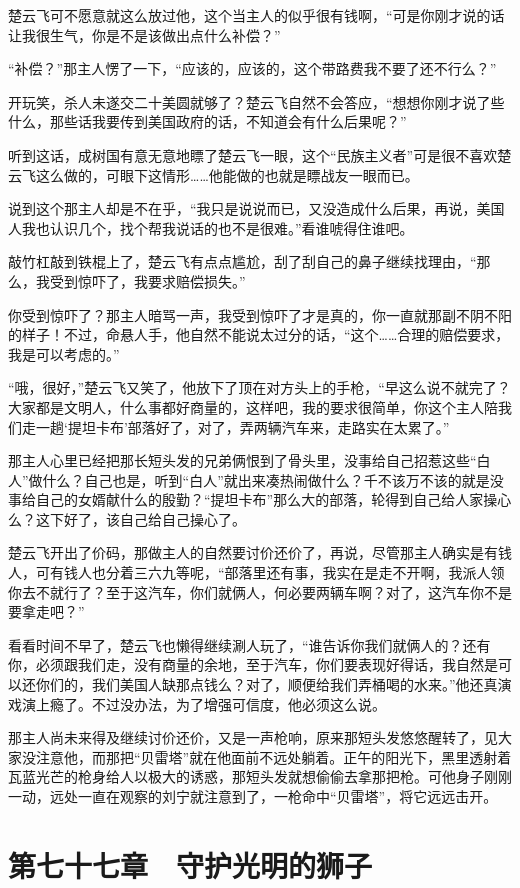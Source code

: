 楚云飞可不愿意就这么放过他，这个当主人的似乎很有钱啊，“可是你刚才说的话让我很生气，你是不是该做出点什么补偿？”

“补偿？”那主人愣了一下，“应该的，应该的，这个带路费我不要了还不行么？”

开玩笑，杀人未遂交二十美圆就够了？楚云飞自然不会答应，“想想你刚才说了些什么，那些话我要传到美国政府的话，不知道会有什么后果呢？”

听到这话，成树国有意无意地瞟了楚云飞一眼，这个“民族主义者”可是很不喜欢楚云飞这么做的，可眼下这情形……他能做的也就是瞟战友一眼而已。

说到这个那主人却是不在乎，“我只是说说而已，又没造成什么后果，再说，美国人我也认识几个，找个帮我说话的也不是很难。”看谁唬得住谁吧。

敲竹杠敲到铁棍上了，楚云飞有点点尴尬，刮了刮自己的鼻子继续找理由，“那么，我受到惊吓了，我要求赔偿损失。”

你受到惊吓了？那主人暗骂一声，我受到惊吓了才是真的，你一直就那副不阴不阳的样子！不过，命悬人手，他自然不能说太过分的话，“这个……合理的赔偿要求，我是可以考虑的。”

“哦，很好，”楚云飞又笑了，他放下了顶在对方头上的手枪，“早这么说不就完了？大家都是文明人，什么事都好商量的，这样吧，我的要求很简单，你这个主人陪我们走一趟‘提坦卡布’部落好了，对了，弄两辆汽车来，走路实在太累了。”

那主人心里已经把那长短头发的兄弟俩恨到了骨头里，没事给自己招惹这些“白人”做什么？自己也是，听到“白人”就出来凑热闹做什么？千不该万不该的就是没事给自己的女婿献什么的殷勤？“提坦卡布”那么大的部落，轮得到自己给人家操心么？这下好了，该自己给自己操心了。

楚云飞开出了价码，那做主人的自然要讨价还价了，再说，尽管那主人确实是有钱人，可有钱人也分着三六九等呢，“部落里还有事，我实在是走不开啊，我派人领你去不就行了？至于这汽车，你们就俩人，何必要两辆车啊？对了，这汽车你不是要拿走吧？”

看看时间不早了，楚云飞也懒得继续涮人玩了，“谁告诉你我们就俩人的？还有你，必须跟我们走，没有商量的余地，至于汽车，你们要表现好得话，我自然是可以还你们的，我们美国人缺那点钱么？对了，顺便给我们弄桶喝的水来。”他还真演戏演上瘾了。不过没办法，为了增强可信度，他必须这么说。

那主人尚未来得及继续讨价还价，又是一声枪响，原来那短头发悠悠醒转了，见大家没注意他，而那把“贝雷塔”就在他面前不远处躺着。正午的阳光下，黑里透射着瓦蓝光芒的枪身给人以极大的诱惑，那短头发就想偷偷去拿那把枪。可他身子刚刚一动，远处一直在观察的刘宁就注意到了，一枪命中“贝雷塔”，将它远远击开。

\section{第七十七章　守护光明的狮子}


